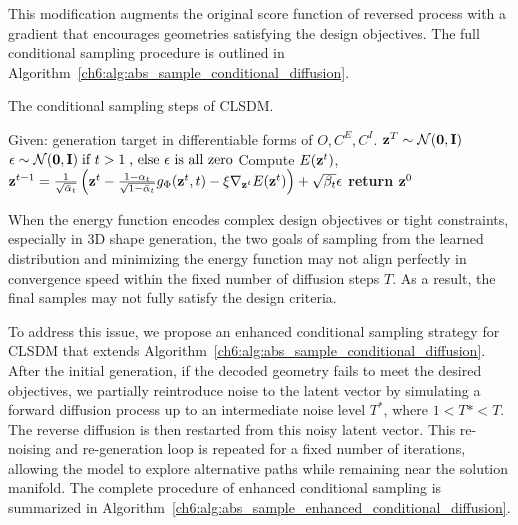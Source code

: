 This modification augments the original score function of reversed process with a gradient that encourages geometries satisfying the design objectives. The full conditional sampling procedure is outlined in Algorithm~\ref{ch6:alg:abs_sample_conditional_diffusion}.
\begin{algorithm}
    \caption{The conditional sampling steps of CLSDM.}
    \label{ch6:alg:abs_sample_conditional_diffusion}
    \begin{algorithmic}
        \State Given: generation target in differentiable forms of $O,C^E,C^I$.
        \State $\mathbf{z}^T \sim \mathcal{N}(\mathbf{0}, \mathbf{I})$
            \State $\mathbf{\epsilon} \sim \mathcal{N}(\mathbf{0}, \mathbf{I})\;\text{if } t>1\;\text{, else } \mathbf{\epsilon} \text{ is all zero}$ 
            \State Compute $E(\mathbf{z}^t)$,
            \State $\mathbf{z}^{t-1} = 
                \frac{1}{\sqrt{\Bar{\alpha}_t}} 
                \left( 
                    \mathbf{z}^t - 
                    \frac{1-\alpha_t}{\sqrt{1-\Bar{\alpha}_t}} g_\Phi(\mathbf{z}^t, t) - 
                    \xi\nabla_{\mathbf{z}^t} E(\mathbf{z}^t) 
                \right) 
                + \sqrt{\beta_t}\mathbf{\epsilon}$
        \EndFor 
        \State \textbf{return} {$\mathbf{z}^0$}
    \end{algorithmic}
\end{algorithm}

When the energy function encodes complex design objectives or tight constraints, especially in 3D shape generation, the two goals of sampling from the learned distribution and minimizing the energy function may not align perfectly in convergence speed within the fixed number of diffusion steps $T$. As a result, the final samples may not fully satisfy the design criteria.

To address this issue, we propose an enhanced conditional sampling strategy for CLSDM that extends Algorithm~\ref{ch6:alg:abs_sample_conditional_diffusion}. After the initial generation, if the decoded geometry fails to meet the desired objectives, we partially reintroduce noise to the latent vector by simulating a forward diffusion process up to an intermediate noise level $T^*$, where $1<T*<T$. The reverse diffusion is then restarted from this noisy latent vector. This re-noising and re-generation loop is repeated for a fixed number of iterations, allowing the model to explore alternative paths while remaining near the solution manifold. The complete procedure of enhanced conditional sampling is summarized in Algorithm~\ref{ch6:alg:abs_sample_enhanced_conditional_diffusion}.

